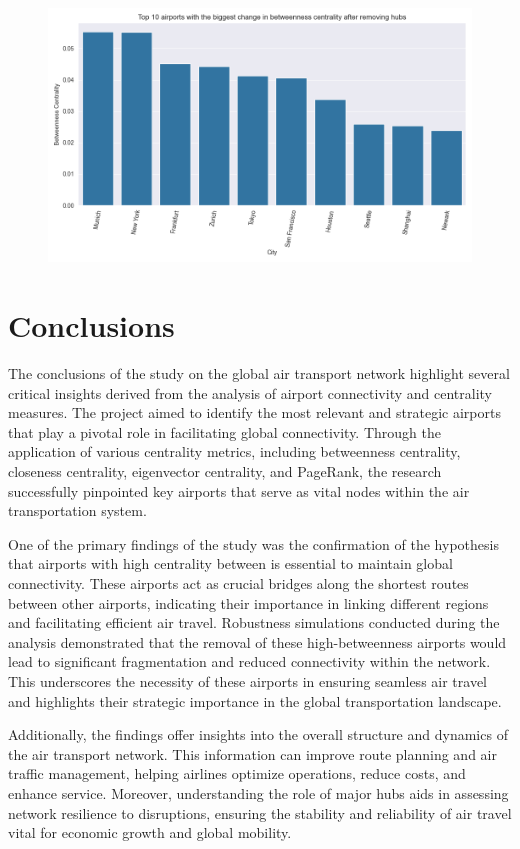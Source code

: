 \documentclass[12pt]{article}
\begin{document}
\begin{figure}[H]
    \centering
    \includegraphics[width=0.8\linewidth]{img/biggest_changes_betweenness_centrality.png}
\end{figure}


\section{Conclusions}
The conclusions of the study on the global air transport network highlight several critical insights derived from the analysis of airport connectivity and centrality measures. The project aimed to identify the most relevant and strategic airports that play a pivotal role in facilitating global connectivity. Through the application of various centrality metrics, including betweenness centrality, closeness centrality, eigenvector centrality, and PageRank, the research successfully pinpointed key airports that serve as vital nodes within the air transportation system. 

One of the primary findings of the study was the confirmation of the hypothesis that airports with high centrality between is essential to maintain global connectivity. These airports act as crucial bridges along the shortest routes between other airports, indicating their importance in linking different regions and facilitating efficient air travel. Robustness simulations conducted during the analysis demonstrated that the removal of these high-betweenness airports would lead to significant fragmentation and reduced connectivity within the network. This underscores the necessity of these airports in ensuring seamless air travel and highlights their strategic importance in the global transportation landscape. 

Additionally, the findings offer insights into the overall structure and dynamics of the air transport network. This information can improve route planning and air traffic management, helping airlines optimize operations, reduce costs, and enhance service. Moreover, understanding the role of major hubs aids in assessing network resilience to disruptions, ensuring the stability and reliability of air travel vital for economic growth and global mobility.
\end{document}
